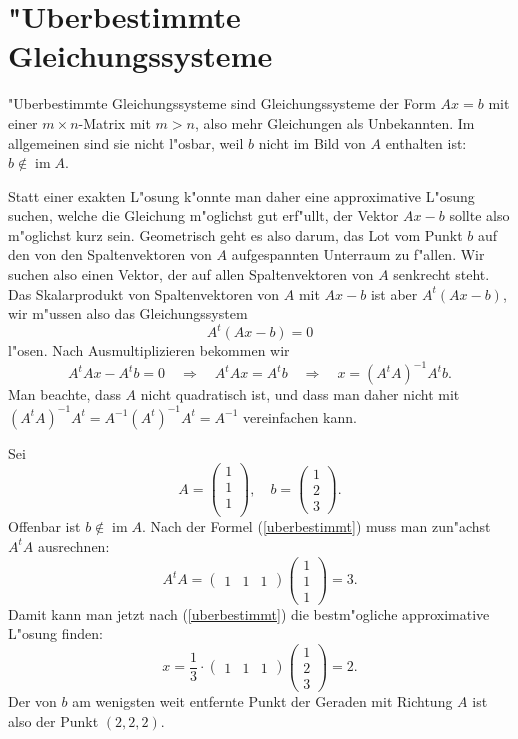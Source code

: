 \section{"Uberbestimmte Gleichungssysteme\label{section:ueberbestimmt}}
"Uberbestimmte Gleichungssysteme sind Gleichungssysteme der Form
$Ax=b$ mit einer $m\times n$-Matrix mit $m>n$, also mehr Gleichungen
als Unbekannten.
Im allgemeinen sind sie nicht l"osbar, weil $b$ nicht
im Bild von $A$ enthalten ist: $b\not\in \operatorname{im}A$.

Statt einer exakten L"osung k"onnte man daher eine approximative
L"osung suchen, welche die Gleichung m"oglichst gut erf"ullt,
der Vektor $Ax-b$ sollte also m"oglichst kurz sein.
Geometrisch
geht es also darum, das Lot vom Punkt $b$ auf den von den Spaltenvektoren
von $A$ aufgespannten Unterraum zu f"allen.
Wir suchen also
einen Vektor, der auf allen Spaltenvektoren von $A$ senkrecht steht.
Das Skalarprodukt von Spaltenvektoren von $A$ mit $Ax-b$ ist aber
$A^t(Ax-b)$, wir m"ussen also das Gleichungssystem
\[A^t(Ax-b)=0\]
l"osen.
Nach Ausmultiplizieren bekommen wir
\begin{equation}
A^tAx-A^tb=0\quad\Rightarrow\quad A^tAx=A^tb\quad\Rightarrow\quad
x=(A^tA)^{-1}A^tb.
\label{uberbestimmt}
\end{equation}
Man beachte, dass $A$ nicht quadratisch ist, und dass man daher
nicht mit $(A^tA)^{-1}A^t=A^{-1}(A^t)^{-1}A^t=A^{-1}$ vereinfachen
kann.

\begin{beispiel}
Sei 
\[
A=\begin{pmatrix}1\\1\\1\\\end{pmatrix},\quad b=\begin{pmatrix}1\\2\\3\end{pmatrix}.
\]
Offenbar ist $b\not\in\operatorname{im}A$.
Nach der Formel (\ref{uberbestimmt}) muss man zun"achst $A^tA$ ausrechnen:
\[
A^tA=\begin{pmatrix}1&1&1\end{pmatrix}\begin{pmatrix}1\\1\\1\end{pmatrix}=3.
\]
Damit kann man jetzt nach (\ref{uberbestimmt}) die bestm"ogliche
approximative L"osung finden:
\[
x=\frac13\cdot\begin{pmatrix}1&1&1\end{pmatrix}
\begin{pmatrix}1\\2\\3\end{pmatrix}=2.
\]
Der von $b$ am wenigsten weit entfernte Punkt der Geraden mit
Richtung $A$ ist also der Punkt $(2,2,2)$.
\end{beispiel}

